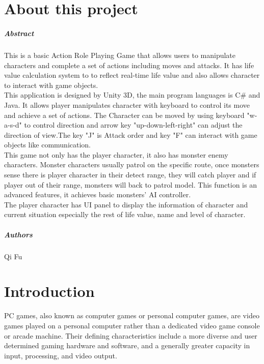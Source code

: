 
\chapter*{About this project}
\paragraph{Abstract}
This is a basic Action Role Playing Game that allows users to manipulate characters and complete a set of actions including moves and attacks. It has life value calculation system to to reflect real-time life value and also allows character to interact with game objects.\\
This application is designed by Unity 3D, the main program languages is C\# and Java. It allows player manipulates character with keyboard to control its move and achieve a set of actions. The Character can be moved by using keyboard "w-a-s-d" to control direction and arrow key "up-down-left-right" can adjust the direction of view.The key "J" is Attack order and key "F" can interact with game objects like communication.\\
This game not only has the player character, it also has monster enemy characters. Monster characters usually patrol on the specific route, once monsters sense there is player character in their detect range, they will catch player and if player out of their range, monsters will back to patrol model. This function is an advanced features, it achieves basic monsters' AI controller.\\
The player character has UI panel to display the information of character and current situation especially the rest of life value, name and level of character.\\
\paragraph{Authors}
Qi Fu



\chapter{Introduction}
PC games, also known as computer games or personal computer games, are video games played on a personal computer rather than a dedicated video game console or arcade machine. Their defining characteristics include a more diverse and user determined gaming hardware and software, and a generally greater capacity in input, processing, and video output.

